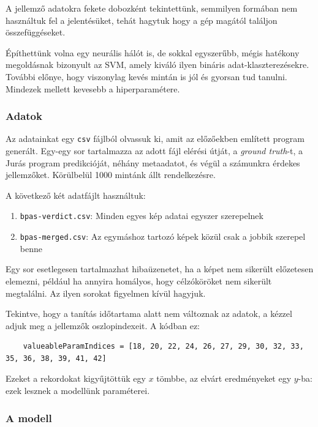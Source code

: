 A jellemző adatokra fekete dobozként tekintettünk, semmilyen formában nem használtuk fel
a jelentésüket, tehát hagytuk hogy a gép magától találjon összefüggéseket.


Építhettünk volna egy neurális hálót is, de sokkal egyszerűbb, mégis hatékony
megoldásnak bizonyult az SVM, amely kiváló ilyen bináris adat-klaszterezésekre.
További előnye, hogy viszonylag kevés mintán is jól és gyorsan tud tanulni.
Mindezek mellett kevesebb a hiperparamétere.


\subsubsection{Adatok}
\label{sec:adatok}

Az adatainkat egy \texttt{csv} fájlból olvassuk ki, amit az előzőekben említett program 
generált. Egy-egy sor tartalmazza az adott fájl elérési útját, a \textit{ground truth}-t,
a Jurás program predikcióját, néhány metaadatot, és végül a számunkra érdekes jellemzőket.
Körülbelül 1000 mintánk állt rendelkezésre.

\noindent
A következő két adatfájlt használtuk:

\begin{enumerate}
\item
	\texttt{bpas-verdict.csv}: Minden egyes kép adatai egyszer szerepelnek
\item
	\texttt{bpas-merged.csv}: Az egymáshoz tartozó képek közül csak a jobbik szerepel benne
\end{enumerate}

Egy sor esetlegesen tartalmazhat hibaüzenetet, ha a képet nem sikerült előzetesen elemezni, például 
ha annyira homályos, hogy célzóköröket nem sikerült megtalálni. Az ilyen sorokat figyelmen kívül hagyjuk.

Tekintve, hogy a tanítás időtartama alatt nem változnak az adatok, a kézzel adjuk
meg a jellemzők oszlopindexeit. A kódban ez:
\begin{lstlisting}  
	valueableParamIndices = [18, 20, 22, 24, 26, 27, 29, 30, 32, 33, 35, 36, 38, 39, 41, 42]
\end{lstlisting}

Ezeket a rekordokat kigyűjtöttük egy $ x $ tömbbe, az elvárt eredményeket egy $ y $-ba:
ezek lesznek a modellünk paraméterei.



\subsubsection{A modell}

